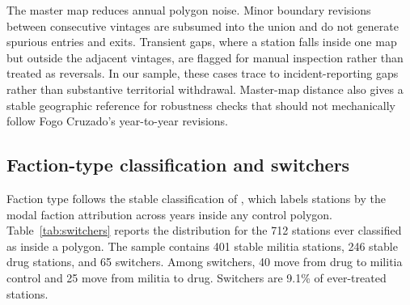 \documentclass[11pt]{article}
\begin{document}
The master map reduces annual polygon noise. Minor boundary revisions between consecutive vintages are subsumed into the union and do not generate spurious entries and exits. Transient gaps, where a station falls inside one map but outside the adjacent vintages, are flagged for manual inspection rather than treated as reversals. In our sample, these cases trace to incident-reporting gaps rather than substantive territorial withdrawal. Master-map distance also gives a stable geographic reference for robustness checks that should not mechanically follow Fogo Cruzado's year-to-year revisions.

\subsection{Faction-type classification and switchers}

Faction type follows the stable classification of \citet{monteiro2023enterprises}, which labels stations by the modal faction attribution across years inside any control polygon. Table~\ref{tab:switchers} reports the distribution for the 712 stations ever classified as inside a polygon. The sample contains 401 stable militia stations, 246 stable drug stations, and 65 switchers. Among switchers, 40 move from drug to militia control and 25 move from militia to drug. Switchers are 9.1\% of ever-treated stations.
\end{document}
